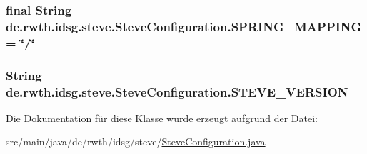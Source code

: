 \hypertarget{classde_1_1rwth_1_1idsg_1_1steve_1_1_steve_configuration_aecc681bfa1ab888ae98352bfc28f7384}{
\subsubsection[{S\-P\-R\-I\-N\-G\-\_\-\-M\-A\-P\-P\-I\-N\-G}]{\setlength{\rightskip}{0pt plus 5cm}final String de.\-rwth.\-idsg.\-steve.\-Steve\-Configuration.\-S\-P\-R\-I\-N\-G\-\_\-\-M\-A\-P\-P\-I\-N\-G = \char`\"{}/\char`\"{}\hspace{0.3cm}{\ttfamily [static]}}}\label{classde_1_1rwth_1_1idsg_1_1steve_1_1_steve_configuration_aecc681bfa1ab888ae98352bfc28f7384}
\hypertarget{classde_1_1rwth_1_1idsg_1_1steve_1_1_steve_configuration_ab5b05aa586a942e62939aa9b25d4edf9}{
\subsubsection[{S\-T\-E\-V\-E\-\_\-\-V\-E\-R\-S\-I\-O\-N}]{\setlength{\rightskip}{0pt plus 5cm}String de.\-rwth.\-idsg.\-steve.\-Steve\-Configuration.\-S\-T\-E\-V\-E\-\_\-\-V\-E\-R\-S\-I\-O\-N\hspace{0.3cm}{\ttfamily [static]}}}\label{classde_1_1rwth_1_1idsg_1_1steve_1_1_steve_configuration_ab5b05aa586a942e62939aa9b25d4edf9}


Die Dokumentation für diese Klasse wurde erzeugt aufgrund der Datei\-:\begin{DoxyCompactItemize}
\item 
src/main/java/de/rwth/idsg/steve/\hyperlink{_steve_configuration_8java}{Steve\-Configuration.\-java}\end{DoxyCompactItemize}

